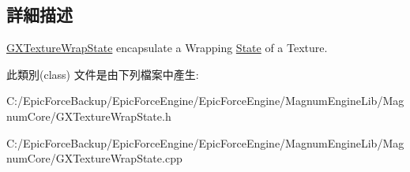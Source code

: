 \subsection{詳細描述}
\hyperlink{class_magnum_1_1_g_x_texture_wrap_state}{G\+X\+Texture\+Wrap\+State} encapsulate a Wrapping \hyperlink{class_magnum_1_1_state}{State} of a Texture. 

此類別(class) 文件是由下列檔案中產生\+:\begin{DoxyCompactItemize}
\item 
C\+:/\+Epic\+Force\+Backup/\+Epic\+Force\+Engine/\+Epic\+Force\+Engine/\+Magnum\+Engine\+Lib/\+Magnum\+Core/G\+X\+Texture\+Wrap\+State.\+h\item 
C\+:/\+Epic\+Force\+Backup/\+Epic\+Force\+Engine/\+Epic\+Force\+Engine/\+Magnum\+Engine\+Lib/\+Magnum\+Core/G\+X\+Texture\+Wrap\+State.\+cpp\end{DoxyCompactItemize}
